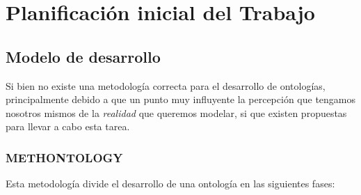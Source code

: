 \chapter{Planificación inicial del Trabajo}

\section{Modelo de desarrollo}

Si bien no existe una metodología correcta para el desarrollo de ontologías, principalmente debido a que un punto muy influyente la percepción que tengamos nosotros mismos de la \textit{realidad} que queremos modelar, si que existen propuestas para llevar a cabo esta tarea.

\subsection{METHONTOLOGY}

Esta metodología divide el desarrollo de una ontología en las siguientes fases:

